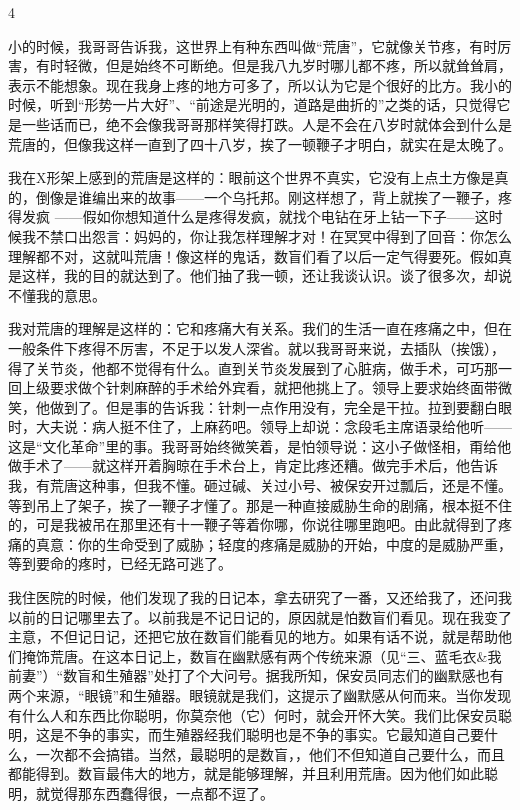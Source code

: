 4 

小的时候，我哥哥告诉我，这世界上有种东西叫做“荒唐”，它就像关节疼，有时厉害，有时轻微，但是始终不可断绝。但是我八九岁时哪儿都不疼，所以就耸耸肩，表示不能想象。现在我身上疼的地方可多了，所以认为它是个很好的比方。我小的时候，听到“形势一片大好”、“前途是光明的，道路是曲折的”之类的话，只觉得它是一些话而已，绝不会像我哥哥那样笑得打跌。人是不会在八岁时就体会到什么是荒唐的，但像我这样一直到了四十八岁，挨了一顿鞭子才明白，就实在是太晚了。 

我在X形架上感到的荒唐是这样的：眼前这个世界不真实，它没有上点土方像是真的，倒像是谁编出来的故事——一个乌托邦。刚这样想了，背上就挨了一鞭子，疼得发疯 ——假如你想知道什么是疼得发疯，就找个电钻在牙上钻一下子——这时候我不禁口出怨言：妈妈的，你让我怎样理解才对！在冥冥中得到了回音：你怎么理解都不对，这就叫荒唐！像这样的鬼话，数盲们看了以后一定气得要死。假如真是这样，我的目的就达到了。他们抽了我一顿，还让我谈认识。谈了很多次，却说不懂我的意思。 

我对荒唐的理解是这样的：它和疼痛大有关系。我们的生活一直在疼痛之中，但在一般条件下疼得不厉害，不足于以发人深省。就以我哥哥来说，去插队（挨饿），得了关节炎，他都不觉得有什么。直到关节炎发展到了心脏病，做手术，可巧那一回上级要求做个针刺麻醉的手术给外宾看，就把他挑上了。领导上要求始终面带微笑，他做到了。但是事的告诉我：针刺一点作用没有，完全是干拉。拉到要翻白眼时，大夫说：病人挺不住了，上麻药吧。领导上却说：念段毛主席语录给他听—— 这是“文化革命”里的事。我哥哥始终微笑着，是怕领导说：这小子做怪相，甭给他做手术了——就这样开着胸晾在手术台上，肯定比疼还糟。做完手术后，他告诉我，有荒唐这种事，但我不懂。砸过碱、关过小号、被保安开过瓢后，还是不懂。等到吊上了架子，挨了一鞭子才懂了。那是一种直接威胁生命的剧痛，根本挺不住的，可是我被吊在那里还有十一鞭子等着你哪，你说往哪里跑吧。由此就得到了疼痛的真意：你的生命受到了威胁；轻度的疼痛是威胁的开始，中度的是威胁严重，等到要命的疼时，已经无路可逃了。 

我住医院的时候，他们发现了我的日记本，拿去研究了一番，又还给我了，还问我以前的日记哪里去了。以前我是不记日记的，原因就是怕数盲们看见。现在我变了主意，不但记日记，还把它放在数盲们能看见的地方。如果有话不说，就是帮助他们掩饰荒唐。在这本日记上，数盲在幽默感有两个传统来源（见“三、蓝毛衣\&我前妻”）“数盲和生殖器”处打了个大问号。据我所知，保安员同志们的幽默感也有两个来源，“眼镜”和生殖器。眼镜就是我们，这提示了幽默感从何而来。当你发现有什么人和东西比你聪明，你莫奈他（它）何时，就会开怀大笑。我们比保安员聪明，这是不争的事实，而生殖器经我们聪明也是不争的事实。它最知道自己要什么，一次都不会搞错。当然，最聪明的是数盲，，他们不但知道自己要什么，而且都能得到。数盲最伟大的地方，就是能够理解，并且利用荒唐。因为他们如此聪明，就觉得那东西蠢得很，一点都不逗了。 

